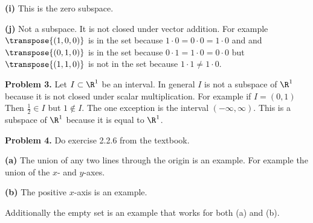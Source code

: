 \documentclass[oneside,12pt]{amsart}
\begin{document}
\smallskip

\textbf{(i)} This is the zero subspace.

\smallskip

\textbf{(j)} Not a subspace. It is not closed under vector addition. For
example $\transpose{(1,0,0)}$ is in the set
because $1\cdot 0 =  0 \cdot 0 = 1\cdot 0$ and
and $\transpose{(0,1,0)}$ is in the set because $0\cdot 1 = 1\cdot 0 = 0\cdot 0$
but $\transpose{(1,1,0)}$ is not in the set because $1\cdot1 \not= 1\cdot 0$.

\smallskip

\textbf{Problem 3.} Let $I\subset\R^1$ be an interval. In general $I$ is not
a subspace of $\R^1$ because it is not closed under scalar multiplication.
For example if $I=(0,1)$ Then $\frac{1}{2}\in I$ but $1\notin I$. The one exception
is the interval $(-\infty, \infty)$. This is a subspace of $\R^1$ because it
is equal to $\R^1$.

\smallskip

\textbf{Problem 4.} Do exercise 2.2.6 from the textbook.

\smallskip

\textbf{(a)} The union of any two lines through the origin is an example.
For example the union of the $x$- and $y$-axes.

\smallskip

\textbf{(b)} The positive $x$-axis is an example.

\smallskip

Additionally the empty set is an example that works for both (a) and (b).
\end{document}
